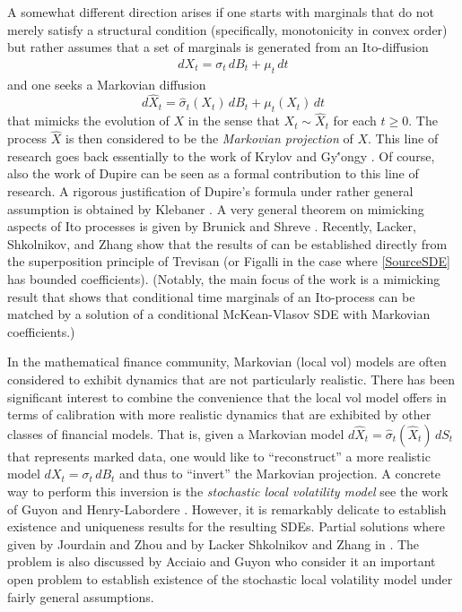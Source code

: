 \documentclass[11pt,a4paper]{article}%
\numberwithin{equation}{section}
\begin{document}
\medskip 



A somewhat different direction arises if one starts with marginals that do not merely satisfy a structural condition (specifically,  monotonicity in  convex order) but rather assumes that a set of marginals is generated from an Ito-diffusion
\begin{align}\label{SourceSDE} dX_t = \sigma_t \, dB_t + \mu_t\, dt\end{align}
and one seeks a Markovian diffusion 
$$ d\hat X_t = \hat \sigma_t (X_t) \, dB_t + \mu_t(X_t)\, dt$$
that mimicks the evolution of $X$ in the sense that $X_t \sim \hat X_t$ for each $t\geq 0$. The process $\hat X$ is then considered to be the \emph{Markovian projection} of $X$. This line of research goes back essentially to the work of Krylov \cite{Kr85} and Gy\''ongy \cite{Gy86}. Of course, also the work of Dupire \cite{Du94} can be seen as a formal contribution to this line of research.
A rigorous justification of Dupire's formula under rather general assumption is obtained by Klebaner \cite{Kl02}. 
A very general theorem on mimicking aspects of Ito processes is given by Brunick and Shreve \cite{BrSh13}. Recently, Lacker, Shkolnikov, and Zhang \cite{LaShZh20} show that the results of \cite{Gy86, BrSh13} can be established directly from the superposition principle of Trevisan \cite{Tr16} (or Figalli \cite{Fi08} in the case where \eqref{SourceSDE} has bounded coefficients). (Notably, the main focus of the work  \cite{LaShZh20} is a mimicking result that shows that conditional time marginals of an Ito-process can be matched by a solution of a conditional McKean-Vlasov SDE with Markovian coefficients.) 


	

In the mathematical finance community, Markovian (local vol) models are often considered to exhibit dynamics that are not particularly realistic. There has been significant interest to combine the convenience that the local vol model offers in terms of calibration with more realistic dynamics that are exhibited by other classes of financial models. That is,  given a Markovian model $d\hat X_t = \hat \sigma_t (\hat X_t)\, dS_t$ that represents marked data, one would like to ``reconstruct'' a more  realistic model $d X_t = \sigma_t \, dB_t$ and thus to ``invert'' the Markovian projection. A concrete way to perform this inversion is the \emph{stochastic local volatility model} see the work of Guyon and Henry-Labordere \cite{GuHe11, GuHe12, GuHe13}. However, it is remarkably delicate to establish existence and uniqueness results for the resulting SDEs.
Partial solutions where given by 
Jourdain and Zhou \cite{JoZh16} and by Lacker Shkolnikov and Zhang in  \cite{LaShZh19}. The problem is also discussed by Acciaio and Guyon \cite{AcGu20} who consider it an important open problem to establish existence of the stochastic local volatility model under fairly general assumptions. 



%
%


%
%

\end{document}
